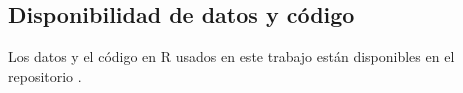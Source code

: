 \subsection*{Disponibilidad de datos y código}

Los datos y el código en R usados en este trabajo están disponibles en el repositorio \enlacerepositorio.
